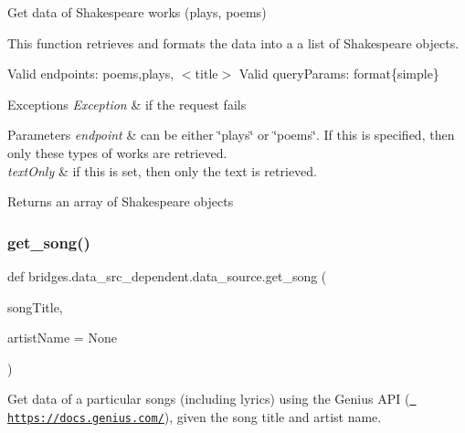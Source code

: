 Get data of Shakespeare works (plays, poems) 

This function retrieves and formats the data into a a list of Shakespeare objects.

Valid endpoints\+: \textquotesingle{}poems\textquotesingle{},\textquotesingle{}plays\textquotesingle{}, $<$title$>$ Valid query\+Params\+: format\{simple\}


\begin{DoxyExceptions}{Exceptions}
{\em Exception} & if the request fails\\
\hline
\end{DoxyExceptions}

\begin{DoxyParams}{Parameters}
{\em endpoint} & can be either \char`\"{}plays\char`\"{} or \char`\"{}poems\char`\"{}. If this is specified, then only these types of works are retrieved. \\
\hline
{\em text\+Only} & if this is set, then only the text is retrieved.\\
\hline
\end{DoxyParams}
\begin{DoxyReturn}{Returns}
an array of Shakespeare objects 
\end{DoxyReturn}
\mbox{\label{namespacebridges_1_1data__src__dependent_1_1data__source_a060ab8ec1777a5458a37d5e01e594e82}} 
\subsubsection{\texorpdfstring{get\_song()}{get\_song()}}
{\footnotesize\ttfamily def bridges.\+data\+\_\+src\+\_\+dependent.\+data\+\_\+source.\+get\+\_\+song (\begin{DoxyParamCaption}\item[{}]{song\+Title,  }\item[{}]{artist\+Name = {\ttfamily None} }\end{DoxyParamCaption})}



Get data of a particular songs (including lyrics) using the Genius A\+PI (\href{https://docs.genius.com/}{\texttt{ https\+://docs.\+genius.\+com/}}), given the song title and artist name. 

